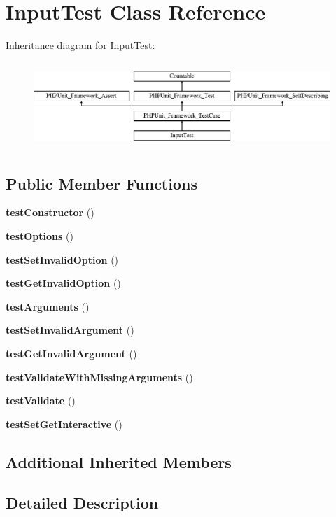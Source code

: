\section{Input\+Test Class Reference}
\label{class_symfony_1_1_component_1_1_console_1_1_tests_1_1_input_1_1_input_test}
Inheritance diagram for Input\+Test\+:\begin{figure}[H]
\begin{center}
\leavevmode
\includegraphics[height=3.303835cm]{class_symfony_1_1_component_1_1_console_1_1_tests_1_1_input_1_1_input_test}
\end{center}
\end{figure}
\subsection*{Public Member Functions}
\begin{DoxyCompactItemize}
\item 
{\bf test\+Constructor} ()
\item 
{\bf test\+Options} ()
\item 
{\bf test\+Set\+Invalid\+Option} ()
\item 
{\bf test\+Get\+Invalid\+Option} ()
\item 
{\bf test\+Arguments} ()
\item 
{\bf test\+Set\+Invalid\+Argument} ()
\item 
{\bf test\+Get\+Invalid\+Argument} ()
\item 
{\bf test\+Validate\+With\+Missing\+Arguments} ()
\item 
{\bf test\+Validate} ()
\item 
{\bf test\+Set\+Get\+Interactive} ()
\end{DoxyCompactItemize}
\subsection*{Additional Inherited Members}


\subsection{Detailed Description}


